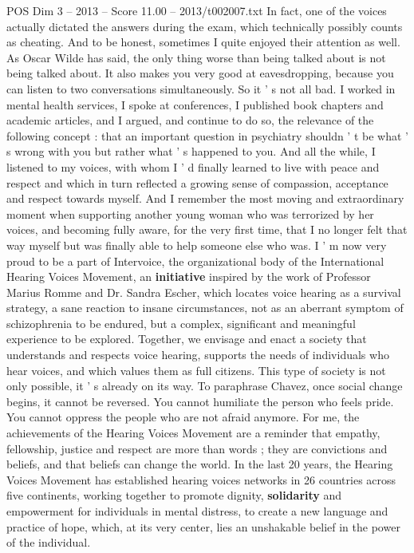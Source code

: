 \begin{textsample}{POS Dim 3 – 2013 – Score 11.00 – 2013/t002007.txt}
In fact, one of the voices actually dictated the answers during the exam, which technically possibly counts as cheating.
And to be honest, sometimes I quite enjoyed their attention as well.
As Oscar Wilde has said, the only thing worse than being talked about is not being talked about.
It also makes you very good at eavesdropping, because you can listen to two conversations simultaneously.
So it ' s not all bad.
I worked in mental health services, I spoke at conferences, I published book chapters and academic articles, and I argued, and continue to do so, the relevance of the following concept : that an important question in psychiatry shouldn ' t be what ' s wrong with you but rather what ' s happened to you.
And all the while, I listened to my voices, with whom I ' d finally learned to live with peace and respect and which in turn reflected a growing sense of compassion, acceptance and respect towards myself.
And I remember the most moving and extraordinary moment when supporting another young woman who was terrorized by her voices, and becoming fully aware, for the very first time, that I no longer felt that way myself but was finally able to help someone else who was.
I ' m now very proud to be a part of Intervoice, the organizational body of the International Hearing Voices Movement, an \textbf{initiative} inspired by the work of Professor Marius Romme and Dr.
Sandra Escher, which locates voice hearing as a survival strategy, a sane reaction to insane circumstances, not as an aberrant symptom of schizophrenia to be endured, but a complex, significant and meaningful experience to be explored.
Together, we envisage and enact a society that understands and respects voice hearing, supports the needs of individuals who hear voices, and which values them as full citizens.
This type of society is not only possible, it ' s already on its way.
To paraphrase Chavez, once social change begins, it cannot be reversed.
You cannot humiliate the person who feels pride.
You cannot oppress the people who are not afraid anymore.
For me, the achievements of the Hearing Voices Movement are a reminder that empathy, fellowship, justice and respect are more than words ; they are convictions and beliefs, and that beliefs can change the world.
In the last 20 years, the Hearing Voices Movement has established hearing voices networks in 26 countries across five continents, working together to promote dignity, \textbf{solidarity} and empowerment for individuals in mental distress, to create a new language and practice of hope, which, at its very center, lies an unshakable belief in the power of the individual.

\end{textsample}
